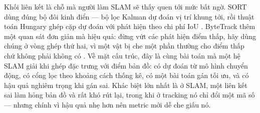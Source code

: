 \documentclass[../../../deep_learning.tex]{subfiles}
\begin{document}
Khối liên kết là chỗ mà người làm SLAM sẽ thấy quen tới mức bất ngờ. SORT dùng đúng bộ đôi kinh điển --- bộ lọc Kalman dự đoán vị trí khung tới, rồi thuật toán Hungary ghép cặp dự đoán với phát hiện theo chi phí IoU \cite{bewley2016sort}. ByteTrack thêm một quan sát đơn giản mà hiệu quả: đừng vứt các phát hiện điểm thấp, hãy dùng chúng ở vòng ghép thứ hai, vì một vật bị che một phần thường cho điểm thấp chứ không phải không có \cite{zhang2022bytetrack}. Về mặt cấu trúc, đây là cùng bài toán  mà một hệ SLAM giải khi ghép đặc trưng với điểm bản đồ: có dự đoán từ mô hình chuyển động, có cổng lọc theo khoảng cách thống kê, có một bài toán gán tối ưu, và có hậu quả nghiêm trọng khi gán sai. 
Khác biệt lớn nhất là ở SLAM, một liên kết sai làm hỏng bản đồ và rất khó rút lại, trong khi ở tracking nó chỉ đổi một mã số --- nhưng chính vì hậu quả nhẹ hơn nên metric mới dễ che giấu nó.
\end{document}
